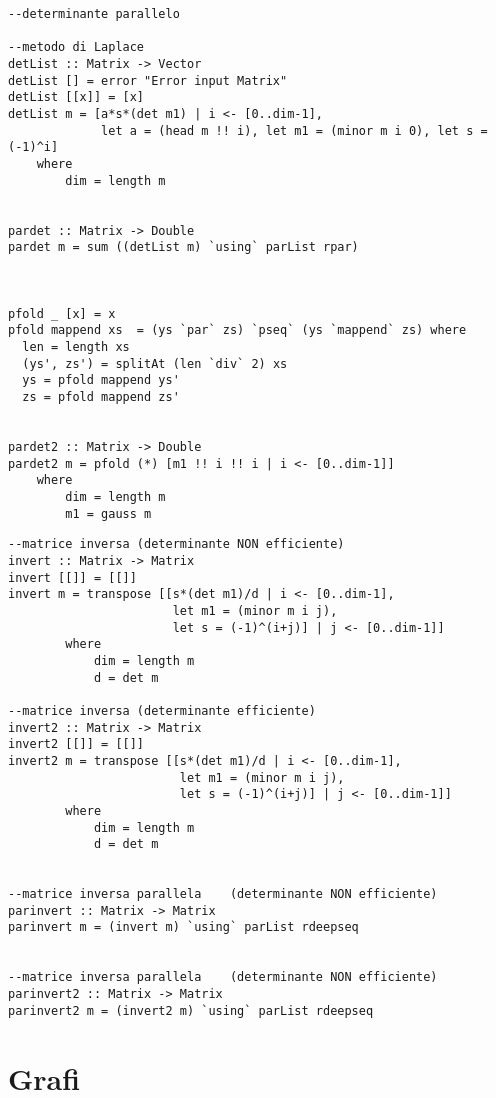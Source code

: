 \newpage
\begin{verbatim}
--determinante parallelo

--metodo di Laplace    
detList :: Matrix -> Vector
detList [] = error "Error input Matrix"
detList [[x]] = [x]
detList m = [a*s*(det m1) | i <- [0..dim-1], 
             let a = (head m !! i), let m1 = (minor m i 0), let s = (-1)^i] 
    where
        dim = length m
        

pardet :: Matrix -> Double
pardet m = sum ((detList m) `using` parList rpar)



pfold _ [x] = x
pfold mappend xs  = (ys `par` zs) `pseq` (ys `mappend` zs) where
  len = length xs
  (ys', zs') = splitAt (len `div` 2) xs
  ys = pfold mappend ys'
  zs = pfold mappend zs'
  

pardet2 :: Matrix -> Double
pardet2 m = pfold (*) [m1 !! i !! i | i <- [0..dim-1]]
    where
        dim = length m
        m1 = gauss m
\end{verbatim}
\newpage
\begin{verbatim}
--matrice inversa (determinante NON efficiente)
invert :: Matrix -> Matrix
invert [[]] = [[]]
invert m = transpose [[s*(det m1)/d | i <- [0..dim-1], 
                       let m1 = (minor m i j), 
                       let s = (-1)^(i+j)] | j <- [0..dim-1]]
        where
            dim = length m
            d = det m

--matrice inversa (determinante efficiente)        
invert2 :: Matrix -> Matrix
invert2 [[]] = [[]]
invert2 m = transpose [[s*(det m1)/d | i <- [0..dim-1], 
                        let m1 = (minor m i j), 
                        let s = (-1)^(i+j)] | j <- [0..dim-1]]
        where
            dim = length m
            d = det m
            
            
--matrice inversa parallela    (determinante NON efficiente)            
parinvert :: Matrix -> Matrix            
parinvert m = (invert m) `using` parList rdeepseq


--matrice inversa parallela    (determinante NON efficiente)    
parinvert2 :: Matrix -> Matrix            
parinvert2 m = (invert2 m) `using` parList rdeepseq
\end{verbatim}
\newpage
\section{Grafi}

